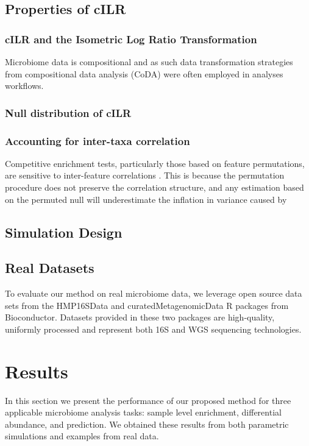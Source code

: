 \documentclass{article}
\begin{document}
\subsection*{Properties of cILR}
\subsubsection*{cILR and the Isometric Log Ratio Transformation}
Microbiome data is compositional \cite{gloor2017} and as such data transformation strategies from compositional data analysis (CoDA) \cite{aitchison} were often employed in analyses workflows. 
\subsubsection*{Null distribution of cILR}
\subsubsection*{Accounting for inter-taxa correlation}
Competitive enrichment tests, particularly those based on feature permutations, are sensitive to inter-feature correlations \cite{wu2012}. This is because the permutation procedure does not preserve the correlation structure, and any estimation based on the permuted null will underestimate the inflation in variance caused by

\subsection*{Simulation Design}
\subsection*{Real Datasets}
To evaluate our method on real microbiome data, we leverage open source data sets from the HMP16SData \cite{schiffer2019} and curatedMetagenomicData \cite{pasolli2017} R packages from Bioconductor. Datasets provided in these two packages are high-quality, uniformly processed and represent both 16S and WGS sequencing technologies.  


\section*{Results}
In this section we present the performance of our proposed method for three applicable microbiome analysis tasks: sample level enrichment, differential abundance, and prediction. We obtained these results from both parametric simulations and examples from real data.  
\end{document}
